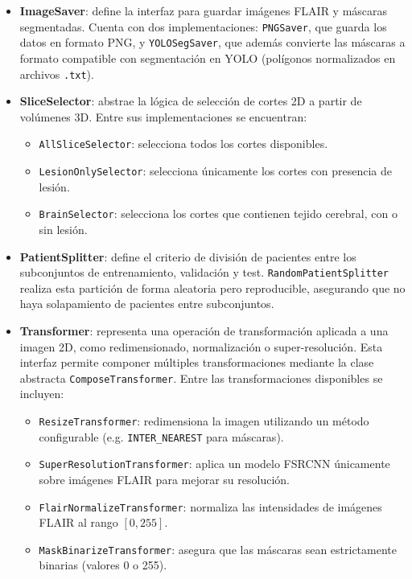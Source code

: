 \documentclass[../main.tex]{subfiles}
\begin{document}
\begin{itemize}
    \item \textbf{ImageSaver}: define la interfaz para guardar imágenes FLAIR y máscaras segmentadas. Cuenta con dos implementaciones: \texttt{PNGSaver}, que guarda los datos en formato PNG, y \texttt{YOLOSegSaver}, que además convierte las máscaras a formato compatible con segmentación en YOLO (polígonos normalizados en archivos \texttt{.txt}).

    \item \textbf{SliceSelector}: abstrae la lógica de selección de cortes 2D a partir de volúmenes 3D. Entre sus implementaciones se encuentran:
    \begin{itemize}
        \item \texttt{AllSliceSelector}: selecciona todos los cortes disponibles.
        \item \texttt{LesionOnlySelector}: selecciona únicamente los cortes con presencia de lesión.
        \item \texttt{BrainSelector}: selecciona los cortes que contienen tejido cerebral, con o sin lesión.
    \end{itemize}

    \item \textbf{PatientSplitter}: define el criterio de división de pacientes entre los subconjuntos de entrenamiento, validación y test.  \texttt{RandomPatientSplitter} realiza esta partición de forma aleatoria pero reproducible, asegurando que no haya solapamiento de pacientes entre subconjuntos.

    \item \textbf{Transformer}: representa una operación de transformación aplicada a una imagen 2D, como redimensionado, normalización o super-resolución. Esta interfaz permite componer múltiples transformaciones mediante la clase abstracta \texttt{ComposeTransformer}. Entre las transformaciones disponibles se incluyen:
    \begin{itemize}
        \item \texttt{ResizeTransformer}: redimensiona la imagen utilizando un método configurable (e.g. \texttt{INTER\_NEAREST} para máscaras).
        \item \texttt{SuperResolutionTransformer}: aplica un modelo FSRCNN únicamente sobre imágenes FLAIR para mejorar su resolución.
        \item \texttt{FlairNormalizeTransformer}: normaliza las intensidades de imágenes FLAIR al rango $[0, 255]$.
        \item \texttt{MaskBinarizeTransformer}: asegura que las máscaras sean estrictamente binarias (valores 0 o 255).
    \end{itemize}
\end{itemize}
\end{document}
